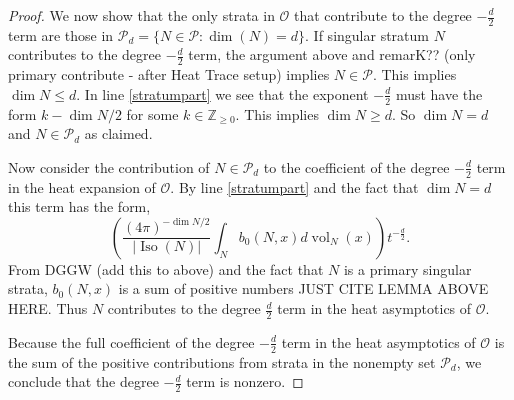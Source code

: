 \documentclass{amsart}
\theoremstyle{plain}
\theoremstyle{definition}
\theoremstyle{remark}
\newcommand{\myabs}[1]{\vert#1\vert}
\newcommand{\cp}{\mathcal{P}}
\newcommand{\orb}{\mathcal O}
\DeclareMathOperator{\iso}{Iso}
\DeclareMathOperator{\vol}{vol}
\begin{document}
\begin{proof}
We now show that the only strata in $\orb$ that contribute to the degree $-\tfrac{d}{2}$ term are those in $\cp_d=\{N \in \cp : \dim(N)=d\}$.  If singular stratum $N$ contributes to the degree $-\tfrac{d}{2}$ term, the argument above and remarK?? (only primary contribute - after Heat Trace setup) implies $N \in \cp$. This implies $\dim{N} \le d$.  In line \ref{stratumpart} we see that the exponent $-\tfrac{d}{2}$ must have the form $k-\dim{N}/2$ for some $k \in \mathbb{Z}_{\ge 0}$.   This implies $\dim{N} \ge d$.  So $\dim{N}=d$ and $N \in \cp_d$ as claimed.

Now consider the contribution of $N \in \cp_d$ to the coefficient of the degree $-\tfrac{d}{2}$ term in the heat expansion of $\orb$.  By line \ref{stratumpart} and the fact that $\dim{N}=d$ this term has the form,
\[\left( \frac{(4\pi)^{-\dim{N}/2}}{\myabs{\iso(N)}} \int_N b_0(N,x) d\vol_N(x) \right) t^{-\tfrac{d}{2}}.\]
From DGGW (add this to above) and the fact that $N$ is a primary singular strata, $b_0(N,x)$ is a sum of positive numbers JUST CITE LEMMA ABOVE HERE.   Thus $N$ contributes to the degree $\tfrac{d}{2}$ term in the heat asymptotics of $\orb$.

Because the full coefficient of the degree $-\tfrac{d}{2}$ term in the heat asymptotics of $\orb$ is the sum of the positive contributions from strata in the nonempty set $\cp_d$, we conclude that the degree $-\tfrac{d}{2}$ term is nonzero.

\end{proof}




\end{document}
